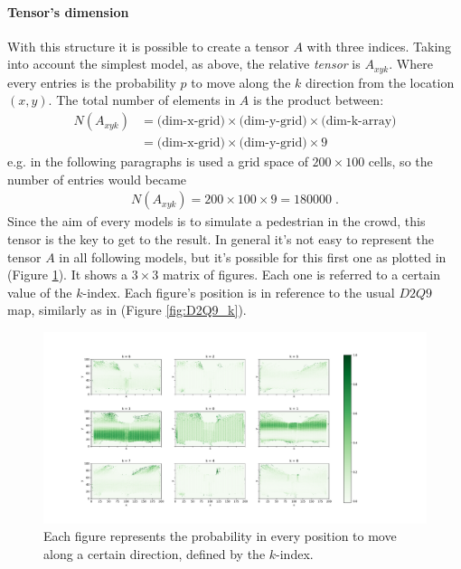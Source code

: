 \documentclass[class=article, crop=false]{standalone}
\begin{document}
\paragraph{Tensor's dimension}
With this structure it is possible to create a tensor $A$ with three indices.
Taking into account the simplest model, as above, the relative \emph{tensor} is $A_{x y k}$.
Where every entries is the probability $p$ to move along the $k$ direction from the location $(x, y)$.
The total number of elements in $A$ is the product between: 
\begin{equation*}
\begin{split}
N(A_{xyk}) &= \mbox{(dim-x-grid)} \times \mbox{(dim-y-grid)} \times \mbox{(dim-k-array)} \\
& = \mbox{(dim-x-grid)} \times \mbox{(dim-y-grid)} \times 9
\end{split}
\end{equation*}
e.g. in the following paragraphs is used a grid space of $200\times100$ cells, so the number of entries would became 
\begin{equation*}
\begin{split}
N(A_{xyk})=200\times100\times9 = 180000 \; .
\end{split}
\end{equation*}
Since the aim of every models is to simulate a pedestrian in the crowd, this tensor is the key to get to the result.
In general it's not easy to represent the tensor $A$ in all following models, but it's possible for this first one as plotted in (Figure \ref{fig:TensorA_D2Q9}).
It shows a $3\times3$ matrix of figures.
Each one is referred to a certain value of the $k$-index.
Each figure's position is in reference to the usual $D2Q9$ map, similarly as in (Figure \ref{fig:D2Q9_k}).
\begin{figure}[h!]
\centering
\includegraphics[scale=0.35]{fig/figure_trainf10_all_trajectories_Dx200_Dy100_TensorA_D2Q9}
\captionsetup{width=.6\linewidth}
\caption{Each figure represents the probability in every position to move along a certain direction, defined by the $k$-index.}
\label{fig:TensorA_D2Q9}
\end{figure}
\end{document}
